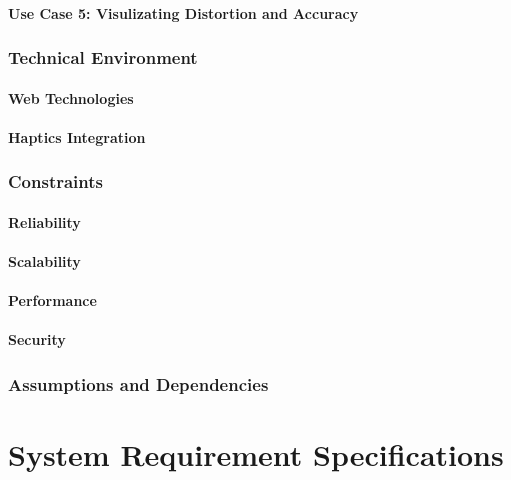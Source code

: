 \documentclass[11pt]{report}
\begin{document}
\subsubsection{Use Case 5: Visulizating Distortion and Accuracy}
 
 
\subsection{Technical Environment}

\subsubsection{Web Technologies}

\subsubsection{Haptics Integration}
 
\subsection{Constraints}

\subsubsection{Reliability}

\subsubsection{Scalability}

\subsubsection{Performance}

\subsubsection{Security} 
 
\subsection{Assumptions and Dependencies}

\chapter{System Requirement Specifications}
\end{document}
